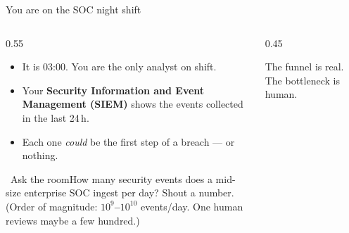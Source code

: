 \documentclass[aspectratio=169,10pt]{beamer}
\newcommand{\term}[1]{{\color{mlink}\textbf{#1}}}         %
\newcommand{\ask}[1]{%
  \begin{exampleblock}{\small\ding{45}\ Ask the room}\small #1\end{exampleblock}}
\begin{document}
\begin{frame}{You are on the SOC night shift}
  \begin{columns}[T]
    \begin{column}{0.55\textwidth}
      \begin{itemize}
        \item It is 03:00. You are the only analyst on shift.
        \item Your \term{Security Information and Event Management (SIEM)} shows the events collected in the last 24\,h.
        \item Each one \emph{could} be the first step of a breach --- or nothing.
      \end{itemize}
      \vspace{0.4em}
      \ask{How many security events does a mid-size enterprise SOC ingest per day?
      Shout a number.\\[0.2em]
      \footnotesize (Order of magnitude: \textbf{$10^9$--$10^{10}$} events/day.
      One human reviews maybe a few hundred.)}
    \end{column}
    \begin{column}{0.45\textwidth}
      \centering
      \par\vspace{0.3em}
      {\footnotesize\color{midgray}The funnel is real. The bottleneck is human.}
    \end{column}
  \end{columns}
\end{frame}
\end{document}
